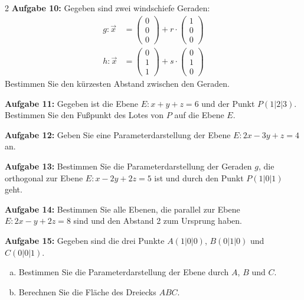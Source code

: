 \documentclass[12pt,a4paper]{article}
\newcommand{\vek}[1]{\vec{#1}}
\begin{document}
\begin{multicols}{2}
\textbf{Aufgabe 10:} Gegeben sind zwei windschiefe Geraden:
\begin{align*}
g: \vek{x} &= \begin{pmatrix}0\\0\\0\end{pmatrix} + r \cdot \begin{pmatrix}1\\0\\0\end{pmatrix} \\
h: \vek{x} &= \begin{pmatrix}0\\1\\1\end{pmatrix} + s \cdot \begin{pmatrix}0\\1\\0\end{pmatrix}
\end{align*}
Bestimmen Sie den kürzesten Abstand zwischen den Geraden.

\vspace{3cm}

\textbf{Aufgabe 11:} Gegeben ist die Ebene $E: x + y + z = 6$ und der Punkt $P(1|2|3)$. Bestimmen Sie den Fußpunkt des Lotes von $P$ auf die Ebene $E$.

\vspace{3cm}

\textbf{Aufgabe 12:} Geben Sie eine Parameterdarstellung der Ebene $E: 2x - 3y + z = 4$ an.

\vspace{3cm}

\textbf{Aufgabe 13:} Bestimmen Sie die Parameterdarstellung der Geraden $g$, die orthogonal zur Ebene $E: x - 2y + 2z = 5$ ist und durch den Punkt $P(1|0|1)$ geht.

\vspace{3cm}

\textbf{Aufgabe 14:} Bestimmen Sie alle Ebenen, die parallel zur Ebene $E: 2x - y + 2z = 8$ sind und den Abstand 2 zum Ursprung haben.

\vspace{3cm}

\textbf{Aufgabe 15:} Gegeben sind die drei Punkte $A(1|0|0)$, $B(0|1|0)$ und $C(0|0|1)$.
\begin{enumerate}[a)]
\item Bestimmen Sie die Parameterdarstellung der Ebene durch $A$, $B$ und $C$.
\item Berechnen Sie die Fläche des Dreiecks $ABC$.
\end{enumerate}


\end{multicols}
\end{document}
